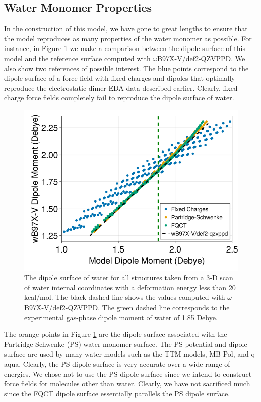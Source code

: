 \documentclass[journal=jctcce,manuscript=article]{achemso}
\begin{document}
\subsection*{Water Monomer Properties}

In the construction of this model, we have gone to great lengths to ensure that the model reproduces as many properties of the water monomer as possible. For instance, in Figure \ref{fig:dipole_surface} we make a comparison between the dipole surface of this model and the reference surface computed with $\omega$B97X-V/def2-QZVPPD. We also show two references of possible interest. The blue points correspond to the dipole surface of a force field with fixed charges and dipoles that optimally reproduce the electrostatic dimer EDA data described earlier. Clearly, fixed charge force fields completely fail to reproduce the dipole surface of water.

\begin{figure}[H]
  \includegraphics*[width=\textwidth]{figures/dipole_surface.png}
  \caption{The dipole surface of water for all structures taken from a
  3-D scan of water internal coordinates with a deformation energy less than
  20 kcal/mol. The black dashed line shows the values computed with $\omega$B97X-V/def2-QZVPPD.
  The green dashed line corresponds to the experimental gas-phase dipole moment
  of water of 1.85 Debye.
}
  \label{fig:dipole_surface}
\end{figure}

The orange points in Figure \ref{fig:dipole_surface} are the dipole surface associated with the Partridge-Schwenke (PS) water monomer surface.\cite{partridge1997determination} The PS potential and dipole surface are used by many water models such as the TTM models,\cite{burnham1999parametrization,fanourgakis2006flexible} MB-Pol\cite{babin2013development,babin2014development}, and q-aqua\cite{yu2022q}. Clearly, the PS dipole surface is very accurate over a wide range of energies. We chose not to use the PS dipole surface since we intend to construct force fields for molecules other than water. Clearly, we have not sacrificed much since the FQCT dipole surface essentially parallels the PS dipole surface.
\end{document}
